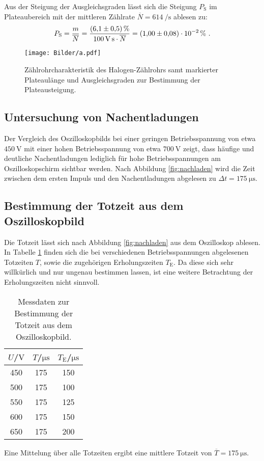 Aus der Steigung der Ausgleichsgraden lässt sich die Steigung $P_\mathrm{S}$ im Plateaubereich mit der mittleren Zählrate $\overline{N}=\SI{614}{\per\second}$ ablesen zu:
\begin{equation*}
  P_\mathrm{S}=\frac{m}{\overline{N}}=\frac{\SI{6.1(5)}{\percent}}{\SI{100}{\volt\second}\cdot \overline{N}}=\SI{1.00(8)E-02}{\percent}
 \text{ .}
\end{equation*}
\begin{figure}
  \centering
  \texttt{[image: Bilder/a.pdf]}
  \caption{Zählrohrcharakteristik des Halogen-Zählrohrs samt markierter Plateaulänge und Ausgleichsgraden zur Bestimmung der Plateausteigung.}
  \label{fig:a}
\end{figure}
\FloatBarrier

\subsection{Untersuchung von Nachentladungen}
Der Vergleich des Oszilloskopbilds bei einer geringen Betriebsspannung von etwa $\SI{450}{\volt}$ mit einer hohen Betriebsspannung von etwa $\SI{700}{\volt}$ zeigt, dass häufige und deutliche Nachentladungen lediglich für hohe Betriebsspannungen am Oszilloskopschirm sichtbar werden.
Nach Abbildung \ref{fig:nachladen} wird die Zeit zwischen dem ersten Impuls und den Nachentladungen abgelesen zu $\Delta t=\SI{175}{\micro\second}$.


\subsection{Bestimmung der Totzeit aus dem Oszilloskopbild}
Die Totzeit lässt sich nach Abbildung \ref{fig:nachladen} aus dem Oszilloskop ablesen.
In Tabelle \ref{tab:c} finden sich die bei verschiedenen Betriebsspannungen abgelesenen Totzeiten $T$, sowie die zugehörigen Erholungszeiten $T_\mathrm{E}$.
Da diese sich sehr willkürlich und nur ungenau bestimmen lassen, ist eine weitere Betrachtung der Erholungszeiten nicht sinnvoll.
\begin{table}
  \centering
  \caption{Messdaten zur Bestimmung der Totzeit aus dem Oszilloskopbild.}
  \label{tab:c}
\begin{tabular}{ccc}
  \toprule
$U$/$\si{\volt}$ & $T$/$\si{\micro\second}$ & $T_\mathrm{E}$/$\si{\micro\second}$ \\
\midrule
450  & 175  & 150  \\
500  & 175  & 100  \\
550  & 175  & 125  \\
600  & 175  & 150  \\
650  & 175  & 200  \\
\bottomrule
\end{tabular}
\end{table}
Eine Mittelung über alle Totzeiten ergibt eine mittlere Totzeit von $\overline{T}=\SI{175}{\micro\second}$.

